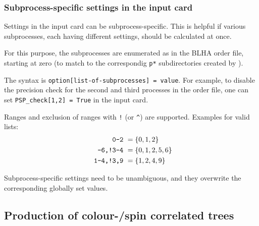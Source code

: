 \subsubsection{Subprocess-specific settings in the \gosam{} input card}
Settings in the \gosam{} input card can be subprocess-specific.
This is helpful if various subprocesses, each having different settings, should be calculated at once.

For this purpose, the subprocesses are enumerated as in the BLHA order file, starting at zero (to match to the
correspondig \texttt{p*} subdirectories created by \gosam{}).


The syntax is \lstinline[style=sh]|option[list-of-subprocesses] = value|.
For example, to disable the precision check 
for the second and third processes in the order file,
one can set \lstinline[style=sh]|PSP_check[1,2] = True| in the input card.

Ranges and exclusion of ranges with \texttt{!} (or \texttt{\^}) are supported.
Examples for valid lists:
\begin{align*}
    \text{\texttt{0-2}         }     &= \{0,1,2\} \\
    \text{\texttt{-6,!3-4}         }  &   = \{0,1,2,5,6\} \\
    \text{\texttt{ 1-4,!3,9}       }   &   = \{1,2,4,9\}
\end{align*}

Subprocess-specific settings need to be unambiguous, and they overwrite 
the corresponding globally set values.

\subsection{Production of colour-/spin correlated trees}

